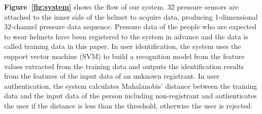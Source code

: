 \documentclass[sigchi,authordraft]{acmart}
\newcommand\figref[1]{\textbf{Figure~\ref{fig:#1}}}
\begin{document}

\figref{system} shows the flow of our system. 32 pressure sensors are attached to the inner side of the helmet to acquire data, producing 1-dimensional 32-channel pressure data sequence. Pressure data of the people who are expected to wear helmets have been registered to the system in advance and the data is called training data in this paper. In user identification, the system uses the support vector machine (SVM) to build a recognition model from the feature values extracted from the training data and outputs the identification results from the features of the input data of an unknown registrant. In user authentication, the system calculates Mahalanobis' distance between the training data and the input data of the person including non-registrant and authenticates the user if the distance is less than the threshold, otherwise the user is rejected.


\end{document}
